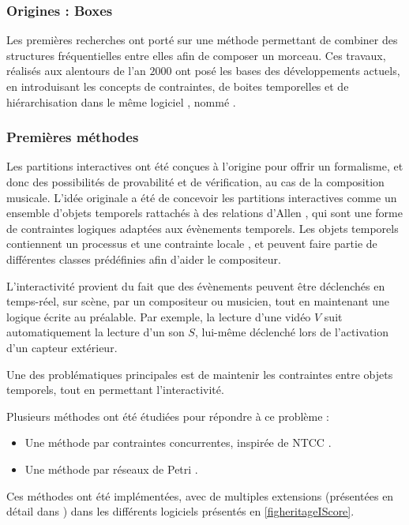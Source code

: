 \subsubsection{Origines : Boxes}
Les premières recherches ont porté sur une méthode permettant de combiner des structures fréquentielles entre elles afin de composer un morceau. Ces travaux, réalisés aux alentours de l'an $\num{2000}$ ont posé les bases des développements actuels, en introduisant les concepts de contraintes, de boites temporelles et de hiérarchisation dans le même logiciel \cite{beurive2000logiciel}, nommé .
\subsubsection{Premières méthodes}
Les partitions interactives ont été conçues à l'origine pour offrir un formalisme, et donc des possibilités de provabilité et de vérification, au cas de la composition musicale. 
L'idée originale a été de concevoir les partitions interactives comme un ensemble d'objets temporels rattachés à des relations d'Allen \cite{allen1983maintaining}, qui sont une forme de contraintes logiques adaptées aux évènements temporels. Les objets temporels contiennent un processus et une contrainte locale \cite{allombert2007system}, et peuvent faire partie de différentes classes prédéfinies afin d'aider le compositeur. 

L'interactivité provient du fait que des évènements peuvent être déclenchés en temps-réel, sur scène, par un compositeur ou musicien, tout en maintenant une logique écrite au préalable. Par exemple, la lecture d'une vidéo $V$ suit automatiquement la lecture d'un son $S$, lui-même déclenché lors de l'activation d'un capteur extérieur. 

Une des problématiques principales est de maintenir les contraintes entre objets temporels, tout en permettant l'interactivité.

Plusieurs méthodes ont été étudiées pour répondre à ce problème :
\begin{itemize}
\item Une méthode par contraintes concurrentes, inspirée de \ac{NTCC} \cite{allombert2006concurrent}.
\item Une méthode par réseaux de Petri \cite{allombert2007system, allombert2009aspects}.
\end{itemize}

Ces méthodes ont été implémentées, avec de multiples extensions (présentées en détail dans \cite[section~3.2]{mauricio2012structured}) dans les différents logiciels présentés en \cref{figheritageIScore}.

